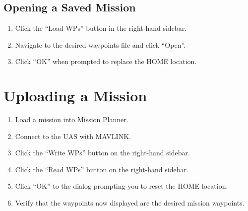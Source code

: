 \documentclass{report}
\begin{document}
		\subsection{Opening a Saved Mission}
			\begin{enumerate}
				\item Click the ``Load WPs'' button in the right-hand sidebar.
				\item Navigate to the desired waypoints file and click ``Open''.
				\item Click ``OK'' when prompted to replace the HOME location.
			\end{enumerate}
	\section{Uploading a Mission}
		\begin{enumerate}
			\item Load a mission into Mission Planner.
			\item Connect to the \gls{UAS} with MAVLINK.
			\item Click the ``Write WPs'' button on the right-hand sidebar.
			\item Click the ``Read WPs'' button on the right-hand sidebar.
			\item Click ``OK'' to the dialog prompting you to reset the HOME location.
			\item Verify that the waypoints now displayed are the desired mission waypoints.
		\end{enumerate}
\end{document}
